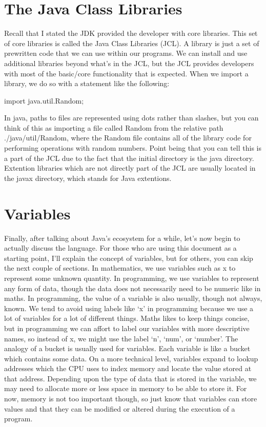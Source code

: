 \documentclass{article}
\begin{document}
\section{The Java Class Libraries}

Recall that I stated the JDK provided the developer with core libraries. This set of core libraries is called
the Java Class Libraries (JCL). A library is just a set of prewritten code that we can use within our
programs. We can install and use additional libraries beyond what’s in the JCL, but the JCL provides
developers with most of the basic/core functionality that is expected. When we import a library, we do so with
a statement like the following:

\begin{jlst}
import java.util.Random;
\end{jlst}

In java, paths to files are represented using dots rather than slashes, but you can think of this as importing
a file called Random from the relative path ./java/util/Random, where the Random file contains all of the
library code for performing operations with random numbers. Point being that you can tell this is a part of
the JCL due to the fact that the initial directory is the java directory. Extention libraries which are not
directly part of the JCL are usually located in the javax directory, which stands for Java extentions.

\section{Variables}

Finally, after talking about Java’s ecosystem for a while, let’s now begin to actually discuss the language.
For those who are using this document as a starting point, I’ll explain the concept of variables, but for
others, you can skip the next couple of sections. In mathematics, we use variables such as x to represent some
unknown quantity. In programming, we use variables to represent any form of data, though the data does not
necessarily need to be numeric like in maths. In programming, the value of a variable is also usually, though
not always, known. We tend to avoid using labels like ‘x’ in programming because we use a lot of variables for
a lot of different things. Maths likes to keep things concise, but in programming we can affort to label our
variables with more descriptive names, so instead of x, we might use the label ‘n’, ‘num’, or ‘number’. The
analogy of a bucket is usually used for variables. Each variable is like a bucket which contains some data. On
a more technical level, variables expand to lookup addresses which the CPU uses to index memory and locate the
value stored at that address. Depending upon the type of data that is stored in the variable, we may need to
allocate more or less space in memory to be able to store it. For now, memory is not too important though, so
just know that variables can store values and that they can be modified or altered during the execution of a
program.
\end{document}

